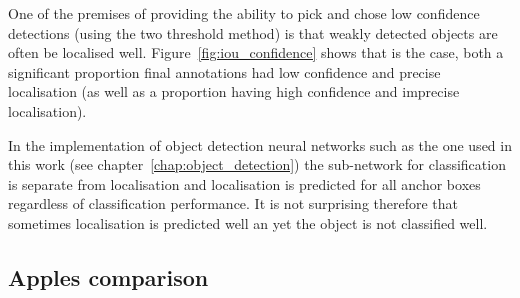 One of the premises of providing the ability to pick and chose low confidence detections (using the two threshold method) is that weakly detected objects are often be localised well. Figure~\ref{fig:iou_confidence} shows that is the case, both a significant proportion final annotations had low confidence and  precise localisation (as well as a proportion having high confidence and imprecise localisation).


\begin{table}[h]
\caption{Breakdown by dataset of detections included as an annotation; confident if $ p > 0.7 $, precise if $ IoU > 0.85 $ with respect to final annotation} 
\noindent{}
\end{table}

In the implementation of object detection neural networks such as the one used in this work (see chapter~\ref{chap:object_detection}) the sub-network for classification is separate from localisation and localisation is predicted for all anchor boxes regardless of classification performance. It is not surprising therefore that sometimes localisation is predicted well an yet the object is not classified well.




\subsection{ Apples comparison }
\label{sec:apples_comparison}


